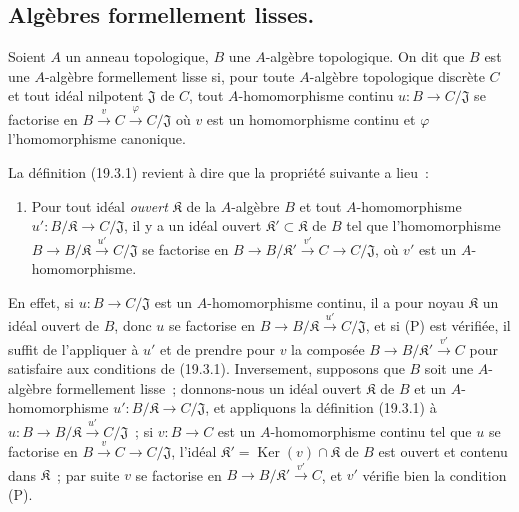 \subsection{Algèbres formellement lisses.}
\label{subsection:0.19.3-fr}

\begin{definition}[19.3.1]
\label{0.19.3.1-fr}
Soient $A$ un anneau topologique, $B$ une $A$-algèbre topologique. On dit que
$B$ est une $A$-algèbre formellement lisse si, pour toute
$A$-algèbre topologique \textup{discrète} $C$
et tout idéal \textup{nilpotent} $\mathfrak J$ de
$C$, tout $A$-homomorphisme continu $u:B\to C/\mathfrak J$ se factorise en
$B\xrightarrow{v}C\xrightarrow{\varphi}C/\mathfrak J$
où $v$ est un homomorphisme continu et $\varphi$ l'homomorphisme canonique.
\end{definition}

La définition (19.3.1) revient à dire que la propriété suivante a lieu~:
\begin{enumerate}
  \item[(P)] Pour tout idéal \emph{ouvert} $\mathfrak K$ de la $A$-algèbre $B$ et
  tout $A$-homomorphisme $u':B/\mathfrak K\to C/\mathfrak J$, il y a un
  idéal ouvert $\mathfrak K'\subset\mathfrak K$ de $B$ tel que
  l'homomorphisme
  $B\to B/\mathfrak K\xrightarrow{u'}C/\mathfrak J$ se factorise en
  $B\to B/\mathfrak K'\xrightarrow{v'}C\to C/\mathfrak J$,
  où $v'$ est un $A$-homomorphisme.
\end{enumerate}

En effet, si $u:B\to C/\mathfrak J$ est un $A$-homomorphisme continu, il a
pour noyau $\mathfrak K$ un idéal ouvert de $B$, donc $u$ se factorise en
$B\to B/\mathfrak K\xrightarrow{u'}C/\mathfrak J$, et si (P) est
vérifiée, il suffit de l'appliquer à $u'$ et de prendre pour $v$ la composée
$B\to B/\mathfrak K'\xrightarrow{v'}C$ pour satisfaire aux conditions de
(19.3.1). Inversement, supposons que $B$ soit une $A$-algèbre formellement
lisse~; donnons-nous un idéal ouvert $\mathfrak K$ de $B$ et un
$A$-homomorphisme $u':B/\mathfrak K\to C/\mathfrak J$, et appliquons la
définition (19.3.1) à
$u:B\to B/\mathfrak K\xrightarrow{u'}C/\mathfrak J$~; si
$v:B\to C$ est un $A$-homomorphisme continu tel que $u$ se factorise en
$B\xrightarrow{v}C\to C/\mathfrak J$, l'idéal
$\mathfrak K'=\operatorname{Ker}(v)\cap\mathfrak K$ de $B$ est ouvert et
contenu dans $\mathfrak K$~; par suite $v$ se factorise en
$B\to B/\mathfrak K'\xrightarrow{v'}C$, et $v'$ vérifie bien la condition
(P).

